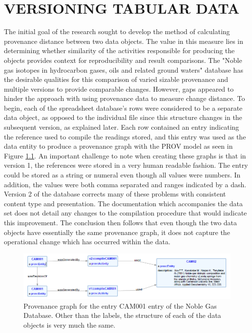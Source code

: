 
\chapter{VERSIONING TABULAR DATA}\label{ch:spreadsheet}

The initial goal of the research sought to develop the method of calculating provenance distance between two data objects.
The value in this measure lies in determining whether similarity of the activities responsible for producing the objects provides context for reproducibility and result comparisons.
The "Noble gas isotopes in hydrocarbon gases, oils and related ground waters" database has the desirable qualities for this comparison of varied sizable provenance and multiple versions to provide comparable changes.
However, gaps appeared to hinder the approach with using provenance data to measure change distance.
To begin, each of the spreadsheet database's rows were considered to be a separate data object, as opposed to the individual file since this structure changes in the subsequent version, as explained later.
Each row contained an entry indicating the reference used to compile the readings stored, and this entry was used as the data entity to produce a provenance graph with the PROV model as seen in Figure \ref{CAM001ProvGraph}.
An important challenge to note when creating these graphs is that in version 1, the references were stored in a very human readable fashion.
The entry could be stored as a string or numeral even though all values were numbers.
In addition, the values were both comma separated and ranges indicated by a dash.
Version 2 of the database corrects many of these problems with consistent content type and presentation.
The documentation which accompanies the data set does not detail any changes to the compilation procedure that would indicate this improvement.
The conclusion then follows that even though the two data objects have essentially the same provenance graph, it does not capture the operational change which has occurred within the data.

\begin{figure}
	\centering
	\includegraphics[scale=0.70]{figures/CAM001v1v2.png}
	\caption{Provenance graph for the entry CAM001 entry of the Noble Gas Database.  Other than the labels, the structure of each of the data objects is very much the same.}
	\label{CAM001ProvGraph}
\end{figure}

